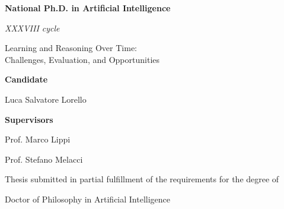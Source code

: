 \documentclass[a4paper,twoside,openright]{book}
\theoremstyle{plain}
\theoremstyle{definition}
\begin{document}
\begin{titlepage}
    \vspace{0.3cm}
    {\Large \textbf{National Ph.D. in Artificial Intelligence}\par}
    \vspace{0.3cm}
    {\normalfont \textit{XXXVIII cycle} \par}
    \vspace{2.3cm}
    
    {\normalfont\bfseries\boldmath\LARGE
    \begin{center}
		Learning and Reasoning Over Time:\\
        Challenges, Evaluation, and Opportunities
    \end{center}
    }	
	
    \vspace{3.9cm}
	
    \begin{minipage}[t]{0.45\textwidth}
    \centering
        \large
        \textbf{Candidate}\par
        Luca Salvatore Lorello\par
    \end{minipage}
    \hfill
    \begin{minipage}[t]{0.45\textwidth}
    \centering
        \large
        \textbf{Supervisors}\par
        Prof. Marco Lippi\par
        Prof. Stefano Melacci\par
    \end{minipage}


    \vfill
    Thesis submitted in partial fulfillment of the requirements for the degree of \par
    Doctor of Philosophy in Artificial Intelligence
\end{titlepage}

\newpage

\frontmatter

\thispagestyle{empty}



\setcounter{page}{-1}
\end{document}

